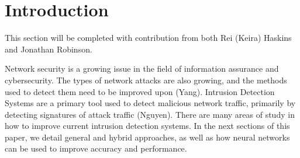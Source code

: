 \section{Introduction}
This section will be completed with contribution from both Rei (Keira) Haskins and Jonathan Robinson.

Network security is a growing issue in the field of information assurance and cybersecurity. The types of network attacks are also growing, and the methods used to detect them need to be improved upon (Yang). Intrusion Detection Systems are a primary tool used to detect malicious network traffic, primarily by detecting signatures of attack traffic (Nguyen). There are many areas of study in how to improve current intrusion detection systems. In the next sections of this paper, we detail general and hybrid approaches, as well as how neural networks can be used to improve accuracy and performance. 

%

